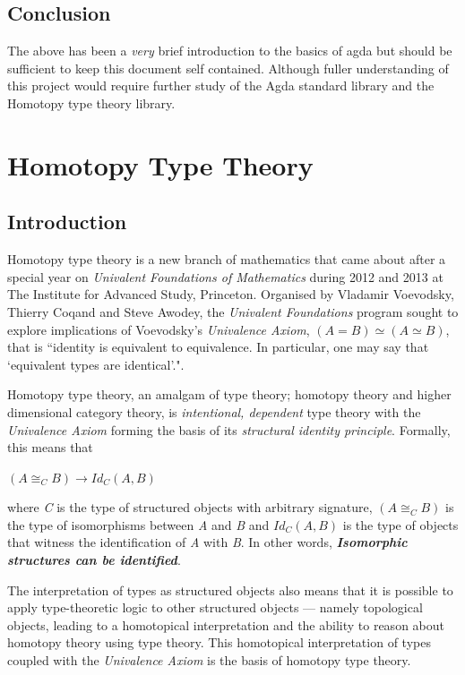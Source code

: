 \documentclass[12pt]{report}
\begin{document}
\section{Conclusion}
The above has been a \textit{very} brief introduction to the basics of agda but should be sufficient to keep this document self contained. Although fuller understanding of this project would require further study of the Agda standard library and the Homotopy type theory library.

\chapter{Homotopy Type Theory}
\section{Introduction}
Homotopy type theory is a new branch of mathematics that came about after a special year on \textit{Univalent Foundations of Mathematics} during 2012 and 2013 at The Institute for Advanced Study, Princeton. Organised by Vladamir Voevodsky, Thierry Coqand and Steve Awodey, the \textit{Univalent Foundations} program sought to explore implications of Voevodsky's \textit{Univalence Axiom}, $(A = B) \simeq (A \simeq B)$, that is ``identity is equivalent to equivalence. In particular, one may say that `equivalent types are identical'."\cite{hott}.

Homotopy type theory, an amalgam of type theory; homotopy theory and higher dimensional category theory, is \textit{intentional, dependent} type theory with the \textit{Univalence Axiom} forming the basis of its \textit{structural identity principle}. Formally, this means that
\begin{center}
$ (A \cong_C B) \rightarrow Id_C(A,B) $
\end{center}
where \textit{C} is the type of structured objects with arbitrary signature, $ (A \cong_C B)$ is the type of isomorphisms between \textit{A} and \textit{B} and $Id_C(A,B) $ is the type of objects that witness the identification of \textit{A} with \textit{B}. In other words, \textbf{\textit{Isomorphic structures can be identified}}.

The interpretation of types as structured objects also means that it is possible to apply type-theoretic logic to other structured objects --- namely topological objects, leading to a homotopical interpretation and the ability to reason about homotopy theory using type theory. This homotopical interpretation of types coupled with the \textit{Univalence Axiom} is the basis of homotopy type theory.
\end{document}

